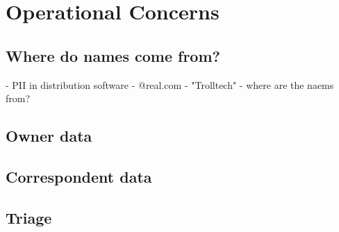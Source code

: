 \chapter{Operational Concerns}
\section{Where do names come from?}
 - PII in distribution software
   - @real.com
   - "Trolltech" - where are the naems from?
\section{Owner data}
\section{Correspondent data}
\section{Triage}
